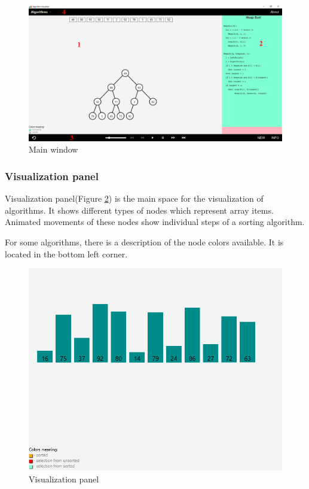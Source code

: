 \documentclass[
  field=inf,
  biblatex,
  language=english,
  glossaries,
  theorems=false,
  sourcecodes=false,
  index
]{kidiplom}
\begin{document}
\begin{figure}[H]
\begin{center}
	
	\includegraphics[width=\textwidth]{img/UI.png}
	\caption{Main window}\label{fig:ui}
\end{center}
\end{figure}

\subsubsection{Visualization panel}
Visualization panel(Figure \ref{fig:vispanel}) is the main space for the visualization of algorithms. It shows different types of nodes which represent array items. Animated movements of these nodes show individual steps of a sorting algorithm. 

For some algorithms, there is a description of the node colors available. It is located in the bottom left corner.

\begin{figure}[H]
\begin{center}
	
	\includegraphics[scale=0.4]{img/ui/Vispanel.png}
	\caption{Visualization panel}\label{fig:vispanel}
\end{center}
\end{figure}
\end{document}
